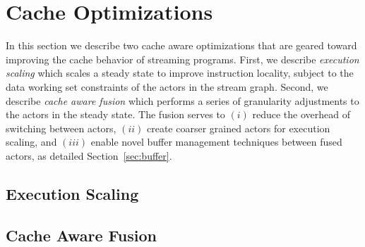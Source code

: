 \section{Cache Optimizations}
\label{sec:cache-opt}

In this section we describe two cache aware optimizations that
are geared toward improving the cache behavior of streaming programs. First, we
describe {\it execution scaling} which 
scales a steady state to improve instruction locality, subject to the
data working set constraints of the actors in the stream graph.
Second, we describe {\it cache aware fusion} which performs a series
of granularity adjustments to the actors in the steady state. The
fusion serves to $(i)$ reduce
the overhead of switching between actors, $(ii)$ create coarser
grained actors for execution scaling, and $(iii)$ enable novel
buffer management techniques between fused actors, as detailed
Section~\ref{sec:buffer}.

\subsection{Execution Scaling}


\subsection{Cache Aware Fusion}
